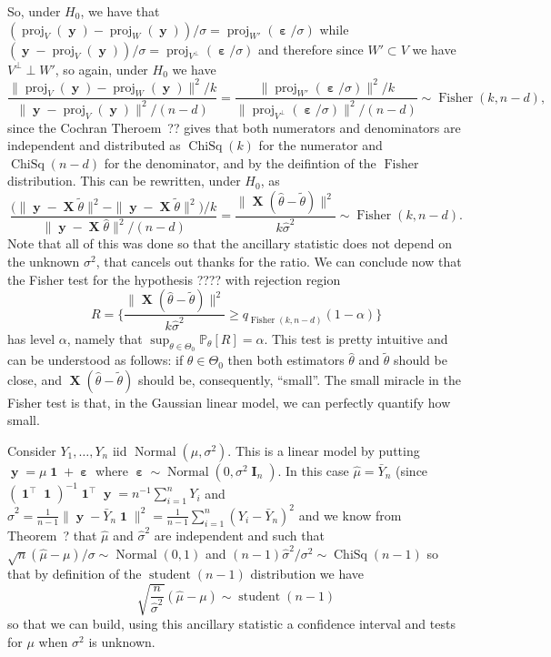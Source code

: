 \documentclass[
	fontsize=11pt, %
	twoside=false, %
	numbers=noenddot, %
]{kaobook}
\DeclareMathOperator{\bI}{{\boldsymbol I}}
\DeclareMathOperator{\bX}{{\boldsymbol X}}
\DeclareMathOperator{\by}{{\boldsymbol y}}
\DeclareMathOperator{\bone}{\boldsymbol 1}
\DeclareMathOperator{\beps}{\boldsymbol \varepsilon}
\DeclareMathOperator{\chisq}{ChiSq}
\DeclareMathOperator{\fis}{Fisher}
\DeclareMathOperator{\nor}{Normal}
\DeclareMathOperator{\stu}{student}
\DeclareMathOperator{\proj}{proj}
\renewcommand{\P}{\mathbb P}
\newcommand{\wh}{\widehat}
\newcommand{\norm}[1]{\|#1\|}
\begin{document}
So, under $H_0$, we have that $(\proj_V(\by) - \proj_W(\by)) / \sigma = \proj_{W'}(\beps / \sigma)$ while 
 $(\by - \proj_V(\by)) / \sigma = \proj_{V^\perp}(\beps / \sigma)$ and therefore since $W' \subset V$ we have $V^\perp \perp W'$, so again, under $H_0$ we have
 \begin{equation*}
 	\frac{\norm{\proj_V(\by) - \proj_W(\by)}^2 / k}{\norm{\by - \proj_V(\by)}^2 / (n - d)} =
 	\frac{\norm{\proj_{W'}(\beps / \sigma)}^2 / k}{\norm{\proj_{V^\perp}(\beps / \sigma)}^2 / (n-d)} \sim \fis(k, n-d),
 \end{equation*}
 since the Cochran Theroem~?? gives that both numerators and denominators are independent and distributed as $\chisq(k)$ for the numerator and $\chisq(n - d)$ for the denominator, and by the deifintion of the $\fis$ distribution.
 This can be rewritten, under $H_0$, as 
 \begin{equation*}
 	\frac{\big(\norm{\by - \bX \tilde \theta}^2 - \norm{\by - \bX \tilde \theta}^2\big) / k}
 	{\norm{\by - \bX \wh \theta}^2 / (n - d)} = \frac{\norm{\bX (\wh \theta - \tilde \theta)}^2}{k \wh \sigma^2} \sim \fis(k, n-d).
 \end{equation*}
 Note that all of this was done so that the ancillary statistic does not depend on the unknown $\sigma^2$, that cancels out thanks for the ratio.
We can conclude now that the Fisher test for the hypothesis ???? with rejection region
\begin{equation*}
	R = \bigg\{  \frac{\norm{\bX (\wh \theta - \tilde \theta)}^2}{k \wh \sigma^2}  \geq q_{\fis(k, n-d)}(1 - \alpha)  \bigg\}
\end{equation*}
has level $\alpha$, namely that $\sup_{\theta \in \Theta_0} \P_\theta[R] = \alpha$.
This test is pretty intuitive and can be understood as follows: if $\theta \in \Theta_0$ then both estimators $\wh \theta$ and $\tilde \theta$ should be close, and $\bX (\wh \theta - \tilde \theta)$ should be, consequently, ``small''. The small miracle in the Fisher test is that, in the Gaussian linear model, we can perfectly quantify how small.

\begin{example}
	Consider $Y_1, \ldots, Y_n$ iid $\nor(\mu, \sigma^2)$. This is a linear model by putting $\by = \mu \bone + \beps$ where $\beps \sim \nor(0, \sigma^2 \bI_n)$.
	In this case $\wh \mu = \bar Y_n$ (since $(\bone^\top \bone)^{-1} \bone^\top \by = n^{-1} \sum_{i=1}^n Y_i$ and $\wh \sigma^2 = \frac{1}{n-1} \norm{\by - \bar Y_n \bone}^2 =  \frac{1}{n-1} \sum_{i=1}^n (Y_i - \bar Y_n)^2$ and we know from Theorem~? that $\wh \mu$ and $\wh \sigma^2$ are independent and such that $\sqrt n (\wh \mu - \mu) / \sigma \sim \nor(0, 1)$ and $(n-1) \wh \sigma^2/\sigma^2 \sim \chisq(n-1)$ so that by definition of the $\stu(n-1)$ distribution we have
	\begin{equation*}
		\sqrt{\frac{n}{\wh \sigma^2}} (\wh \mu - \mu) \sim \stu(n-1)
	\end{equation*}
	so that we can build, using this ancillary statistic a confidence interval and tests for $\mu$ when $\sigma^2$ is unknown.
\end{example}
\end{document}
